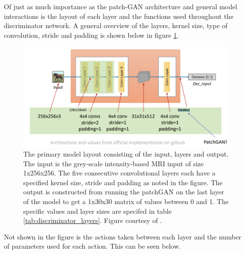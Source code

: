 \documentclass[12pt, fleqn, titlepage]{article}
\begin{document}
Of just as much importance as the patch-GAN architecture and general model interactions is the layout of each layer and the functions used throughout the discriminator network. A general overview of the layers, kernel size, type of convolution, stride and padding is shown below in figure \ref{fig:cyclegandiscriminatorlayers}.
\begin{figure}[H]
	\centering
	\includegraphics[width=0.7\linewidth]{imgs/cyclegan_discriminator_layers}
	\caption{The primary model layout consisting of the input, layers and output. The input is the grey-scale intensity-based MRI input of size 1x256x256. The five consecutive convolutional layers each have a specified kernel size, stride and padding as noted in the figure. The output is constructed from running the patchGAN on the last layer of the model to get a 1x30x30 matrix of values between 0 and 1. The specific values and layer sizes are specifed in table \ref{tab:discriminator_layers}. Figure courtesy of \cite{cyclegan_figures}.}
	\label{fig:cyclegandiscriminatorlayers}
\end{figure}

Not shown in the figure is the actions taken between each layer and the number of parameters used for each action. This can be seen below. 
\end{document}
